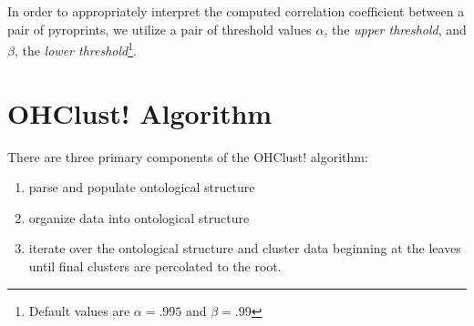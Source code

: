 \documentclass[12pt]{ucthesis}
\begin{document}
      In order to appropriately interpret the computed correlation coefficient
      between a pair of pyroprints, we utilize a pair of threshold values
      $\alpha$, the \textit{upper threshold}, and $\beta$, the \textit{lower
      threshold}\footnote{Default values are $\alpha = .995$ and $\beta =
      .99$}.

   \section{OHClust! Algorithm}\label{sec:ohclust}
      There are three primary components of the \textsf{OHClust!} algorithm:
      \begin{enumerate}
         \item parse and populate ontological structure
         \item organize data into ontological structure
         \item iterate over the ontological structure and cluster data
               beginning at the leaves until final clusters are percolated to
               the root.
      \end{enumerate}
\end{document}
